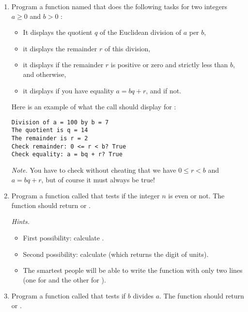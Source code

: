 \documentclass[11pt,class=report,crop=false]{standalone}
\begin{document}
\begin{activite}



\begin{enumerate}
  \item Program a function named  that does the following tasks for two integers $a\ge0$ and $b>0$ :
  \begin{itemize}
    \item It displays the quotient $q$ of the Euclidean division of $a$ per $b$,
    \item it displays the remainder $r$ of this division,
    \item it displays  if the remainder $r$ is positive or zero and strictly less than $b$, and  otherwise,
    \item it displays  if you have equality $a = bq+r$, and  if not.
   \end{itemize}
    
Here is an example of what the call should display for :
\begin{lstlisting}  
Division of a = 100 by b = 7
The quotient is q = 14
The remainder is r = 2
Check remainder: 0 <= r < b? True
Check equality: a = bq + r? True
\end{lstlisting}

\emph{Note.} You have to check without cheating that we have $0 \le r<b$ and $a=bq+r$, but of course it must always be true!
  
  
  \item Program a function called  that tests if the integer $n$ is even or not. The function should return  or .
  
  \emph{Hints.}
  \begin{itemize}
    \item First possibility: calculate .
    \item Second possibility: calculate  (which returns the digit of units).
    \item The smartest people will be able to write the function with only two lines (one for  and the other for ).
   \end{itemize}
   
  \item Program a function called  that tests if $b$ divides $a$. The function should return  or .
  
\end{enumerate}   
     
\end{activite}
\end{document}
